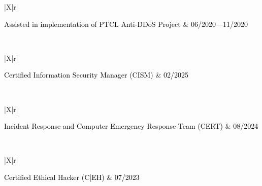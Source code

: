 \documentclass{resume}
\begin{document}
\divider \newline
\begin{tabularx}{\linewidth}{|X|r|}
    \hline
    
    \textcolor{black}{Assisted in implementation of PTCL Anti-DDoS Project} & 
    \textcolor{black}{06/2020---11/2020} \\
    \hline
    
     \\
    \hline
\end{tabularx}

\begin{tabularx}{\linewidth}{|X|r|}
    \hline
    
    \textcolor{black}{Certified Information Security Manager (CISM)} & 
    \textcolor{black}{02/2025} \\
    \hline
    
     \\
    \hline
\end{tabularx}

\divider \newline
\begin{tabularx}{\linewidth}{|X|r|}
    \hline
    
    \textcolor{black}{Incident Response and Computer Emergency Response Team (CERT)} & 
    \textcolor{black}{08/2024} \\
    \hline
    
     \\
    \hline
\end{tabularx}

\divider \newline
\begin{tabularx}{\linewidth}{|X|r|}
    \hline
    
    \textcolor{black}{Certified Ethical Hacker (C|EH)} & 
    \textcolor{black}{07/2023} \\
    \hline
    
     \\
    \hline
\end{tabularx}
\end{document}
